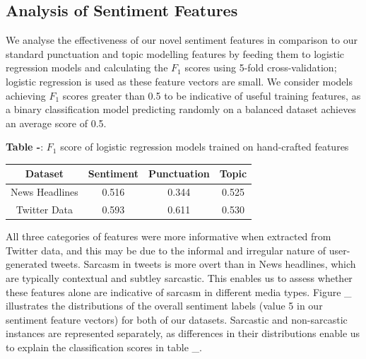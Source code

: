 \documentclass[12pt,a4paper]{article}
\begin{document}
\subsection{Analysis of Sentiment Features}\vspace{-5pt}
\noindent We analyse the effectiveness of our novel sentiment features in comparison to our standard punctuation and topic modelling features by feeding them to logistic regression models and calculating the $F_1$ scores using 5-fold cross-validation; logistic regression is used as these feature vectors are small. We consider models achieving $F_1$ scores greater than 0.5 to be indicative of useful training features, as a binary classification model predicting randomly on a balanced dataset achieves an average score of 0.5. \\\vspace{-20pt}


\begin{center}
	\textbf{Table -}: $F_1$ score of logistic regression models trained on hand-crafted features
\end{center}\vspace{-20pt}

\begin{center}
	\begin{tabular}{|c||c|c|c|} 
	\hline
	\textbf{Dataset} & \textbf{Sentiment} & \textbf{Punctuation} & \textbf{Topic} \\ [0.4ex] 
	\hline\hline
	News Headlines& 0.516 & 0.344 & 0.525\\ 
	\hline
	Twitter Data & 0.593 & 0.611 & 0.530\\
	\hline
\end{tabular}
\end{center}\vspace{-5pt}

\noindent All three categories of features were more informative when extracted from Twitter data, and this may be due to the informal and irregular nature of user-generated tweets. Sarcasm in tweets is more overt than in News headlines, which are typically contextual and subtley sarcastic. This enables us to assess whether these features alone are indicative of sarcasm in different media types. Figure \_ illustrates the distributions of the overall sentiment labels (value 5 in our sentiment feature vectors) for both of our datasets. Sarcastic and non-sarcastic instances are represented separately, as differences in their distributions enable us to explain the classification scores in table \_.
\end{document}
